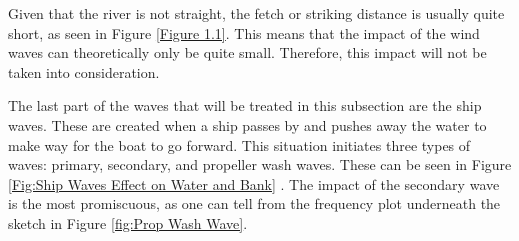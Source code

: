 Given that the river is not straight, the fetch or striking distance is usually quite short, as seen in Figure \ref{Figure 1.1}. This means that the impact of the wind waves can theoretically only be quite small. Therefore, this impact will not be taken into consideration.

The last part of the waves that will be treated in this subsection are the ship waves. These are created when a ship passes by and pushes away the water to make way for the boat to go forward. This situation initiates three types of waves: primary, secondary, and propeller wash waves. These can be seen in Figure \ref{Fig:Ship Waves Effect on Water and Bank} \autocite{antoniniLecture12Ships2025}. The impact of the secondary wave is the most promiscuous, as one can tell from the frequency plot underneath the sketch in Figure \ref{fig:Prop Wash Wave}. 

